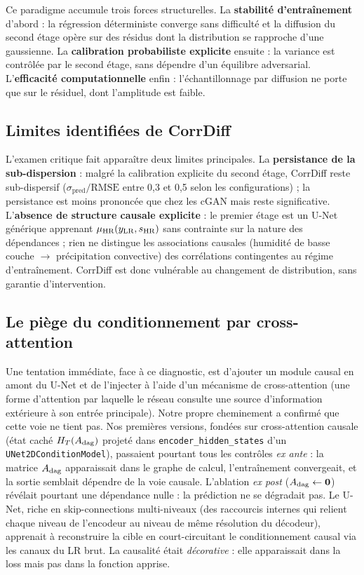 Ce paradigme accumule trois forces structurelles. La \textbf{stabilité d'entraînement} d'abord : la régression déterministe converge sans difficulté et la diffusion du second étage opère sur des résidus dont la distribution se rapproche d'une gaussienne. La \textbf{calibration probabiliste explicite} ensuite : la variance est contrôlée par le second étage, sans dépendre d'un équilibre adversarial. L'\textbf{efficacité computationnelle} enfin : l'échantillonnage par diffusion ne porte que sur le résiduel, dont l'amplitude est faible.

\subsection{Limites identifiées de CorrDiff}
\label{ssec:soa-corrdiff-limites}

L'examen critique fait apparaître deux limites principales. La \textbf{persistance de la sub-dispersion} : malgré la calibration explicite du second étage, CorrDiff reste sub-dispersif ($\sigma_{\mathrm{pred}}/\mathrm{RMSE}$ entre 0,3 et 0,5 selon les configurations) ; la persistance est moins prononcée que chez les cGAN mais reste significative. L'\textbf{absence de structure causale explicite} : le premier étage est un U-Net générique apprenant $\mu_{\text{HR}}(y_{\text{LR}}, s_{\text{HR}})$ sans contrainte sur la nature des dépendances ; rien ne distingue les associations causales (humidité de basse couche $\to$ précipitation convective) des corrélations contingentes au régime d'entraînement. CorrDiff est donc vulnérable au changement de distribution, sans garantie d'intervention.

\subsection{Le piège du conditionnement par cross-attention}
\label{ssec:soa-corrdiff-bypass}

Une tentation immédiate, face à ce diagnostic, est d'ajouter un module causal en amont du U-Net et de l'injecter à l'aide d'un mécanisme de cross-attention (une forme d'attention par laquelle le réseau consulte une source d'information extérieure à son entrée principale). Notre propre cheminement a confirmé que cette voie ne tient pas. Nos premières versions, fondées sur cross-attention causale (état caché $H_T(A_{\mathrm{dag}})$ projeté dans \texttt{encoder\_hidden\_states} d'un \texttt{UNet2DConditionModel}), passaient pourtant tous les contrôles \emph{ex ante} : la matrice $A_{\mathrm{dag}}$ apparaissait dans le graphe de calcul, l'entraînement convergeait, et la sortie semblait dépendre de la voie causale. L'ablation \emph{ex post} ($A_{\mathrm{dag}} \leftarrow \mathbf{0}$) révélait pourtant une dépendance nulle : la prédiction ne se dégradait pas. Le U-Net, riche en skip-connections multi-niveaux (des raccourcis internes qui relient chaque niveau de l'encodeur au niveau de même résolution du décodeur), apprenait à reconstruire la cible en court-circuitant le conditionnement causal via les canaux du LR brut. La causalité était \emph{décorative} : elle apparaissait dans la loss mais pas dans la fonction apprise.

